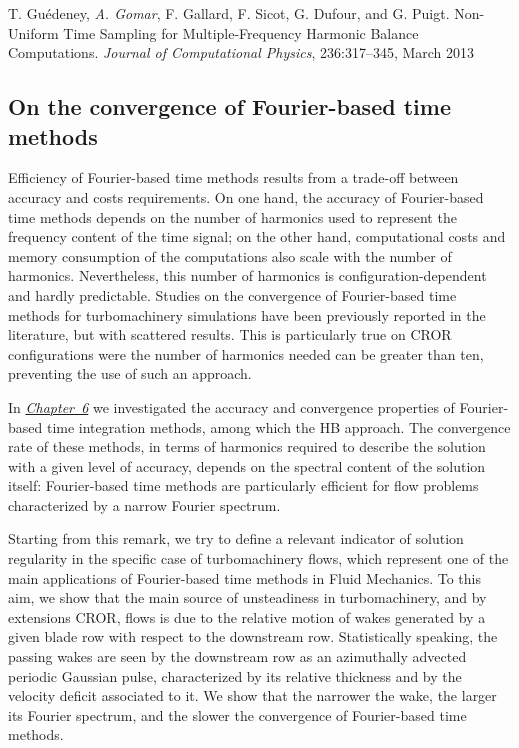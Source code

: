 \noindent
{\small T. Gu\'edeney, \emph{A. Gomar}, F. Gallard, F. Sicot, G. Dufour, and G. Puigt. 
Non-Uniform Time Sampling for Multiple-Frequency Harmonic Balance Computations. 
\emph{Journal of Computational Physics}, 236:317--345, March 2013}


\subsection*{On the convergence of Fourier-based time methods}

Efficiency of Fourier-based time methods results 
from a trade-off between accuracy and 
costs requirements.
On one hand, the accuracy of Fourier-based
time methods depends on the number of harmonics
used to represent the frequency content of the time 
signal; on the other hand, computational costs and 
memory consumption of the computations also scale
with the number of harmonics. 
Nevertheless, this number of harmonics is configuration-dependent 
and hardly predictable. Studies on the convergence of 
Fourier-based time methods for turbomachinery simulations 
have been previously reported in the literature, 
but with scattered results. This is particularly true on
CROR configurations were the number
of harmonics needed can be greater than ten, preventing the
use of such an approach.

In \hyperref[cha:limitations_convergence]{\emph{Chapter~6}}
we investigated the accuracy and convergence properties 
of Fourier-based time integration methods, among which the
HB approach. The convergence rate 
of these methods, in terms of harmonics required to describe the solution 
with a given level of accuracy, depends on the spectral content of the 
solution itself: Fourier-based time methods are particularly efficient 
for flow problems characterized by a narrow Fourier 
spectrum. 

Starting from this remark, we try to define a relevant 
indicator of solution regularity in the specific case of turbomachinery 
flows, which represent one of the main applications of Fourier-based 
time methods in Fluid Mechanics.
To this aim, we show that the main source of unsteadiness in 
turbomachinery, and by extensions CROR, flows is due to the relative motion of wakes 
generated by a given blade row with respect to the downstream row. 
Statistically speaking, the passing wakes are seen by the downstream 
row as an azimuthally advected periodic Gaussian pulse, 
characterized by its relative thickness
and by the velocity deficit 
associated to it. We show that the narrower the wake, the larger 
its Fourier spectrum, and the slower the convergence 
of Fourier-based time methods.

